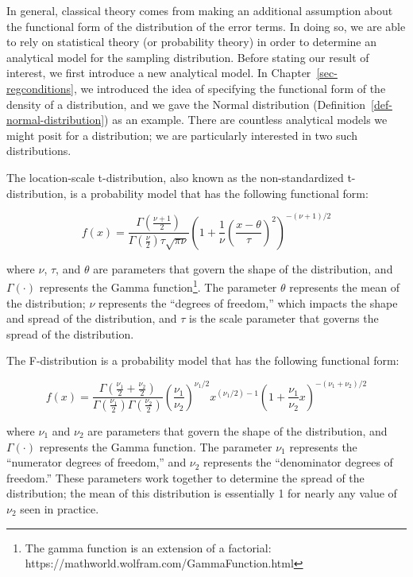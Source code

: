 \documentclass[
  letterpaper,
  DIV=11,
  numbers=noendperiod]{scrreprt}
\theoremstyle{plain}
\theoremstyle{definition}
\theoremstyle{definition}
\theoremstyle{remark}
\begin{document}
In general, classical theory comes from making an additional assumption
about the functional form of the distribution of the error terms. In
doing so, we are able to rely on statistical theory (or probability
theory) in order to determine an analytical model for the sampling
distribution. Before stating our result of interest, we first introduce
a new analytical model. In Chapter~\ref{sec-regconditions}, we
introduced the idea of specifying the functional form of the density of
a distribution, and we gave the Normal distribution
(Definition~\ref{def-normal-distribution}) as an example. There are
countless analytical models we might posit for a distribution; we are
particularly interested in two such distributions.

The location-scale t-distribution, also known as the non-standardized
t-distribution, is a probability model that has the following functional
form:

\[f(x) = \frac{\Gamma\left(\frac{\nu + 1}{2}\right)}{\Gamma\left(\frac{\nu}{2}\right) \tau \sqrt{\pi \nu}} \left(1 + \frac{1}{\nu}\left(\frac{x - \theta}{\tau}\right)^2\right)^{-(\nu + 1)/2}\]

where \(\nu\), \(\tau\), and \(\theta\) are parameters that govern the
shape of the distribution, and \(\Gamma(\cdot)\) represents the Gamma
function\footnote{The gamma function is an extension of a factorial:
  https://mathworld.wolfram.com/GammaFunction.html}. The parameter
\(\theta\) represents the mean of the distribution; \(\nu\) represents
the ``degrees of freedom,'' which impacts the shape and spread of the
distribution, and \(\tau\) is the scale parameter that governs the
spread of the distribution.

The F-distribution is a probability model that has the following
functional form:

\[f(x) = \frac{\Gamma\left(\frac{\nu_1}{2} + \frac{\nu_2}{2}\right)}{\Gamma\left(\frac{\nu_1}{2}\right)\Gamma\left(\frac{\nu_2}{2}\right)} \left(\frac{\nu_1}{\nu_2}\right)^{\nu_1/2} x^{\left(\nu_1/2\right)-1} \left(1 + \frac{\nu_1}{\nu_2}x\right)^{-\left(\nu_1 + \nu_2\right)/2}\]

where \(\nu_1\) and \(\nu_2\) are parameters that govern the shape of
the distribution, and \(\Gamma(\cdot)\) represents the Gamma function.
The parameter \(\nu_1\) represents the ``numerator degrees of freedom,''
and \(\nu_2\) represents the ``denominator degrees of freedom.'' These
parameters work together to determine the spread of the distribution;
the mean of this distribution is essentially 1 for nearly any value of
\(\nu_2\) seen in practice.
\end{document}
